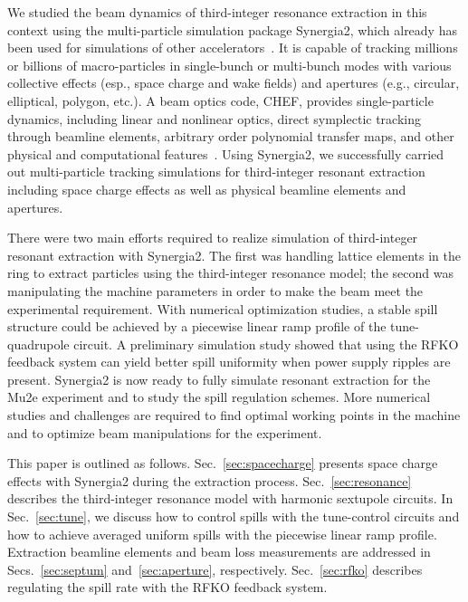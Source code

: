\documentclass[aps,prstab,showpacs,onecolumn,12pt]{revtex4-1}
\begin{document}
We studied the beam dynamics of third-integer resonance extraction in this context using the multi-particle simulation package Synergia2, which already has been used for simulations of other accelerators~\cite{synergia2}. It is capable of tracking millions or billions of macro-particles in single-bunch or multi-bunch modes with various collective effects (esp., space charge and wake fields) and apertures (e.g., circular, elliptical, polygon, etc.). A beam optics code, CHEF, provides single-particle dynamics, including linear and nonlinear optics, direct symplectic tracking through beamline elements, arbitrary order polynomial transfer maps, and other physical and computational features~\cite{chef}. Using Synergia2, we successfully carried out multi-particle tracking simulations for third-integer resonant extraction including space charge effects as well as physical beamline elements and apertures.

There were two main efforts required to realize simulation of third-integer resonant extraction with Synergia2. The first was handling lattice elements in the ring to extract particles using the third-integer resonance model; the second was manipulating the machine parameters in order to make the beam meet the experimental requirement. With numerical optimization studies, a stable spill structure could be achieved by a piecewise linear ramp profile of the tune-quadrupole circuit. A preliminary simulation study showed that using the RFKO feedback system can yield better spill uniformity when power supply ripples are present. Synergia2 is now ready to fully simulate resonant extraction for the Mu2e experiment and to study the spill regulation schemes. More numerical studies and challenges are required to find optimal working points in the machine and to optimize beam manipulations for the experiment.

This paper is outlined as follows. Sec.~\ref{sec:spacecharge} presents space charge effects with Synergia2 during the extraction process. Sec.~\ref{sec:resonance} describes the third-integer resonance model with harmonic sextupole circuits. In Sec.~\ref{sec:tune}, we discuss how to control spills with the tune-control circuits and how to achieve averaged uniform spills with the piecewise linear ramp profile. Extraction beamline elements and beam loss measurements are addressed in Secs.~\ref{sec:septum} and~\ref{sec:aperture}, respectively. Sec.~\ref{sec:rfko} describes regulating the spill rate with the RFKO feedback system.

\end{document}

